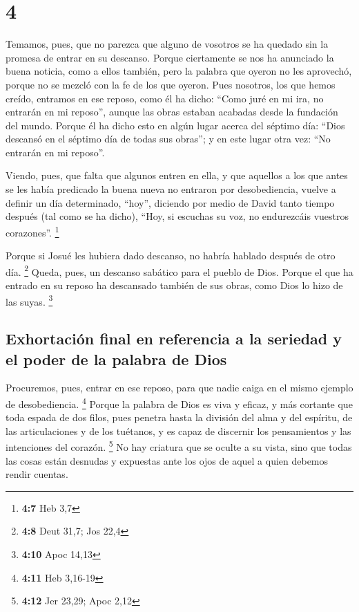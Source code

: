 \hypertarget{section-3}{%
\section{4}\label{section-3}}

 Temamos, pues, que no parezca que alguno de vosotros se
ha quedado sin la promesa de entrar en su descanso. 
Porque ciertamente se nos ha anunciado la buena noticia, como a ellos
también, pero la palabra que oyeron no les aprovechó, porque no se
mezcló con la fe de los que oyeron.  Pues nosotros, los
que hemos creído, entramos en ese reposo, como él ha dicho: ``Como juré
en mi ira, no entrarán en mi reposo'', aunque las obras estaban acabadas
desde la fundación del mundo.  Porque él ha dicho esto en
algún lugar acerca del séptimo día: ``Dios descansó en el séptimo día de
todas sus obras'';  y en este lugar otra vez: ``No
entrarán en mi reposo''.

 Viendo, pues, que falta que algunos entren en ella, y que
aquellos a los que antes se les había predicado la buena nueva no
entraron por desobediencia,  vuelve a definir un día
determinado, ``hoy'', diciendo por medio de David tanto tiempo después
(tal como se ha dicho), ``Hoy, si escuchas su voz, no endurezcáis
vuestros corazones''. \footnote{\textbf{4:7} Heb 3,7}

 Porque si Josué les hubiera dado descanso, no habría
hablado después de otro día. \footnote{\textbf{4:8} Deut 31,7; Jos 22,4}
 Queda, pues, un descanso sabático para el pueblo de Dios.
 Porque el que ha entrado en su reposo ha descansado
también de sus obras, como Dios lo hizo de las suyas. \footnote{\textbf{4:10}
  Apoc 14,13}

\hypertarget{exhortaciuxf3n-final-en-referencia-a-la-seriedad-y-el-poder-de-la-palabra-de-dios}{%
\subsection{Exhortación final en referencia a la seriedad y el poder de
la palabra de
Dios}\label{exhortaciuxf3n-final-en-referencia-a-la-seriedad-y-el-poder-de-la-palabra-de-dios}}

 Procuremos, pues, entrar en ese reposo, para que nadie
caiga en el mismo ejemplo de desobediencia. \footnote{\textbf{4:11} Heb
  3,16-19}  Porque la palabra de Dios es viva y eficaz, y
más cortante que toda espada de dos filos, pues penetra hasta la
división del alma y del espíritu, de las articulaciones y de los
tuétanos, y es capaz de discernir los pensamientos y las intenciones del
corazón. \footnote{\textbf{4:12} Jer 23,29; Apoc 2,12} 
No hay criatura que se oculte a su vista, sino que todas las cosas están
desnudas y expuestas ante los ojos de aquel a quien debemos rendir
cuentas.

